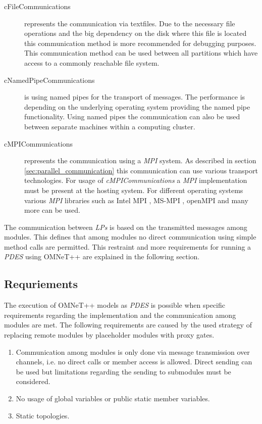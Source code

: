 \begin{description}
    \item[cFileCommunications] represents the communication via textfiles.
    Due to the necessary file operations and the big dependency on the disk where this file is located this communication method is more recommended for debugging purposes.
    This communication method can be used between all partitions which have access to a commonly reachable file system.
    \item[cNamedPipeCommunications] is using named pipes for the transport of messages.
    The performance is depending on the underlying operating system providing the named pipe functionality.
    Using named pipes the communication can also be used between separate machines within a computing cluster.
    \item[cMPICommunications] represents the communication using a \emph{MPI} system.
    As described in section \ref{sec:parallel_communication} this communication can use various transport technologies.
    For usage of \emph{cMPICommunications} a \emph{MPI} implementation must be present at the hosting system.
    For different operating systems various \emph{MPI} libraries such as Intel MPI \cite{intelmpi_hp}, MS-MPI \cite{msmpi_hp}, openMPI \cite{openmpi_hp} and many more can be used.
\end{description}

The communication between \emph{LPs} is based on the transmitted messages among modules.
This defines that among modules no direct communication using simple method calls are permitted.
This restraint and more requirements for running a \emph{PDES} using OMNeT++ are explained in the following section.

\subsection{Requriements}
\label{sec:parallel_omnet_requirements}
The execution of OMNeT++ models as \emph{PDES} is possible when specific requirements regarding the implementation and the communication among modules are met.
The following requirements are caused by the used strategy of replacing remote modules by placeholder modules with proxy gates. \cite[section III.B]{varga_parallel_2003}

\begin{enumerate}
    \item Communication among modules is only done via message transmission over channels, i.e. no direct calls or member access is allowed.
    Direct sending can be used but limitations regarding the sending to submodules must be considered.
    \item No usage of global variables or public static member variables.
    \item Static topologies.
\end{enumerate}

